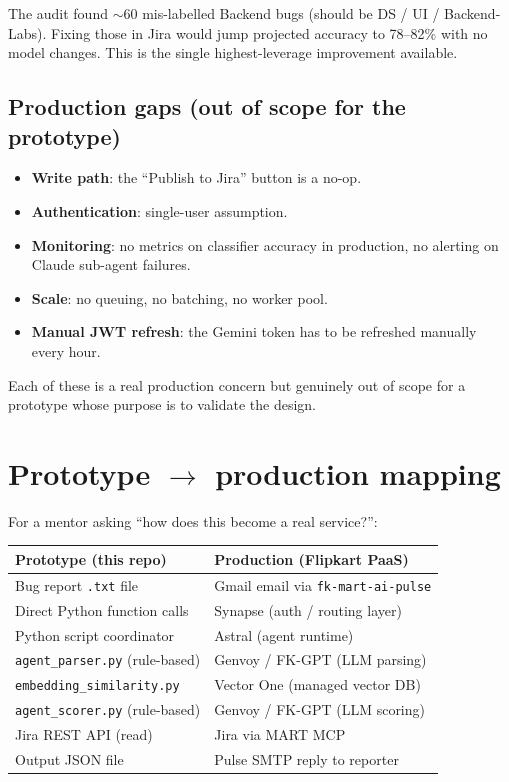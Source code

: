 \documentclass[11pt,a4paper]{article}
\begin{document}
The audit found $\sim$60 mis-labelled Backend bugs (should be DS / UI /
Backend-Labs). Fixing those in Jira would jump projected accuracy to
78--82\% with no model changes. This is the single highest-leverage
improvement available.

\subsection{Production gaps (out of scope for the prototype)}

\begin{itemize}[leftmargin=1.4em,nosep]
\item \textbf{Write path}: the ``Publish to Jira'' button is a no-op.
\item \textbf{Authentication}: single-user assumption.
\item \textbf{Monitoring}: no metrics on classifier accuracy in
      production, no alerting on Claude sub-agent failures.
\item \textbf{Scale}: no queuing, no batching, no worker pool.
\item \textbf{Manual JWT refresh}: the Gemini token has to be refreshed
      manually every hour.
\end{itemize}

Each of these is a real production concern but genuinely out of scope for
a prototype whose purpose is to validate the design.

\newpage

\section{Prototype $\rightarrow$ production mapping}

For a mentor asking ``how does this become a real service?'':

\begin{table}[h]
\centering
\small
\begin{tabularx}{\linewidth}{lX}
\toprule
\textbf{Prototype (this repo)} & \textbf{Production (Flipkart PaaS)} \\
\midrule
Bug report \texttt{.txt} file           & Gmail email via \texttt{fk-mart-ai-pulse} \\
Direct Python function calls            & Synapse (auth / routing layer) \\
Python script coordinator               & Astral (agent runtime) \\
\texttt{agent\_parser.py} (rule-based)  & Genvoy / FK-GPT (LLM parsing) \\
\texttt{embedding\_similarity.py}       & Vector One (managed vector DB) \\
\texttt{agent\_scorer.py} (rule-based)  & Genvoy / FK-GPT (LLM scoring) \\
Jira REST API (read)                    & Jira via MART MCP \\
Output JSON file                        & Pulse SMTP reply to reporter \\
\bottomrule
\end{tabularx}
\end{table}
\end{document}
